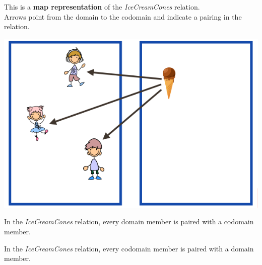 \documentclass{ximera}
\author{Lee Wayand}
\begin{document}
\begin{exercise}

This is a \textbf{map representation} of the \textit{IceCreamCones} relation. \\


Arrows point from the domain to the codomain and indicate a pairing in the relation.


\begin{image}
\includegraphics{../../pics/func_maps/f_25.png}
\end{image}




\begin{question} 
In the \textit{IceCreamCones} relation, every domain member is paired with a codomain member.

\begin{multipleChoice}
\end{multipleChoice}
\end{question}







\begin{question} 
In the \textit{IceCreamCones} relation, every codomain member is paired with a domain member.

\begin{multipleChoice}
\end{multipleChoice}
\end{question}








\end{exercise}
\end{document}
